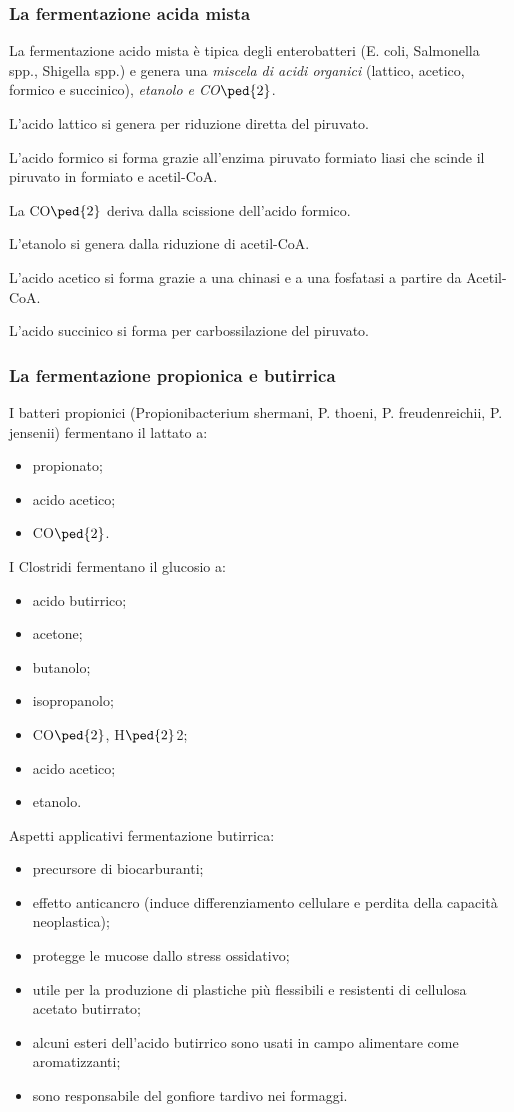 \documentclass[11pt]{book}
\begin{document}
\subsubsection{La fermentazione acida mista}
La fermentazione acido mista è tipica degli enterobatteri (E. coli, Salmonella spp., Shigella spp.) e genera una \emph{miscela di acidi organici} (lattico, acetico, formico e succinico), \emph{etanolo e CO$\ped{2}$}.

\vspace{1em}
L'acido lattico si genera per riduzione diretta del piruvato.

L'acido formico si forma grazie all'enzima piruvato formiato liasi che scinde il piruvato in formiato e acetil-CoA.

La CO$\ped{2}$ deriva dalla scissione dell’acido formico.

L'etanolo si genera dalla riduzione di acetil-CoA.

L'acido acetico si forma grazie a una chinasi e a una fosfatasi a partire da Acetil-CoA.

L'acido succinico si forma per carbossilazione del piruvato.


\subsubsection{La fermentazione propionica e butirrica}
I batteri propionici (Propionibacterium shermani, P. thoeni, P. freudenreichii, P. jensenii) fermentano il lattato a:
\begin{itemize}
\item propionato;
\item acido acetico;
\item CO$\ped{2}$. 
\end{itemize}

I Clostridi fermentano il glucosio a:
\begin{itemize}
\item acido butirrico; 
\item acetone;
\item butanolo;
\item isopropanolo;
\item CO$\ped{2}$, H$\ped{2}$2;
\item acido acetico;
\item etanolo.
\end{itemize}

Aspetti applicativi fermentazione butirrica:
\begin{itemize} 
\item precursore di biocarburanti;
\item effetto anticancro (induce differenziamento cellulare e perdita della capacità neoplastica);
\item protegge le mucose dallo stress ossidativo;
\item utile per la produzione di plastiche più flessibili e resistenti di cellulosa acetato butirrato;
\item alcuni esteri dell’acido butirrico sono usati in campo alimentare come aromatizzanti;
\item sono responsabile del gonfiore tardivo nei formaggi.
\end{itemize}
\end{document}
